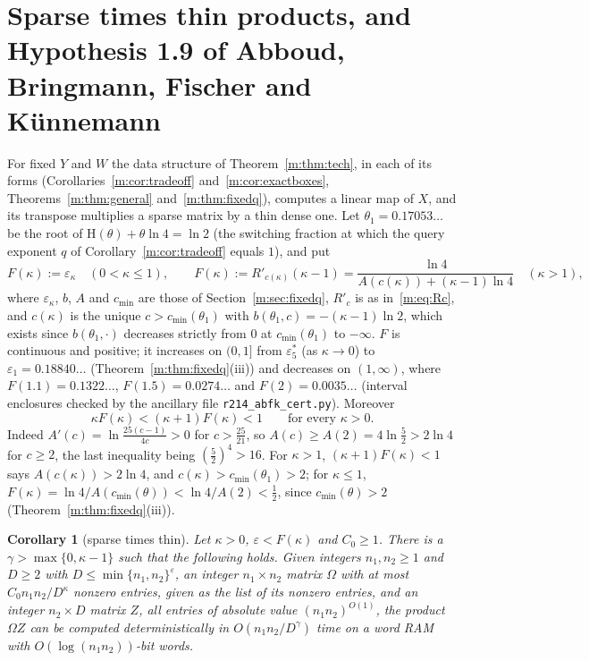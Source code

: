\documentclass[11pt]{article}
\newtheorem{corollary}[theorem]{Corollary}
\theoremstyle{definition}
\theoremstyle{remark}
\newcommand{\Hh}{\mathrm{H}}
\newcommand{\es}{\varepsilon^*_5}
\newcommand{\HintedOMvRfourteen}{0.18840}%
\newcommand{\ThetaOne}{0.17053}%
\newcommand{\ABFKFDSoneone}{0.1322}%
\newcommand{\ABFKFDSonefive}{0.0274}%
\newcommand{\ABFKFDStwo}{0.0035}%
\begin{document}
\section{Sparse times thin products, and Hypothesis 1.9 of Abboud, Bringmann, Fischer and K\"unnemann}\label{m:sec:abfk}

For fixed $Y$ and $W$ the data structure of Theorem~\ref{m:thm:tech}, in each of its forms (Corollaries~\ref{m:cor:tradeoff} and~\ref{m:cor:exactboxes}, Theorems~\ref{m:thm:general} and~\ref{m:thm:fixedq}), computes a linear map of $X$, and its transpose multiplies a sparse matrix by a thin dense one. Let $\theta_1=\ThetaOne\ldots$ be the root of $\Hh(\theta)+\theta\ln4=\ln2$ (the switching fraction at which the query exponent $q$ of Corollary~\ref{m:cor:tradeoff} equals $1$), and put
\[
F(\kappa):=\varepsilon_\kappa\quad(0<\kappa\le1),\qquad
F(\kappa):=R'_{c(\kappa)}(\kappa-1)=\frac{\ln4}{A(c(\kappa))+(\kappa-1)\ln4}\quad(\kappa>1),
\]
where $\varepsilon_\kappa$, $b$, $A$ and $c_{\min}$ are those of Section~\ref{m:sec:fixedq}, $R'_c$ is as in~\eqref{m:eq:Rc}, and $c(\kappa)$ is the unique $c>c_{\min}(\theta_1)$ with $b(\theta_1,c)=-(\kappa-1)\ln2$, which exists since $b(\theta_1,\cdot)$ decreases strictly from $0$ at $c_{\min}(\theta_1)$ to $-\infty$. $F$ is continuous and positive; it increases on $(0,1]$ from $\es$ (as $\kappa\to0$) to $\varepsilon_1=\HintedOMvRfourteen\ldots$ (Theorem~\ref{m:thm:fixedq}(iii)) and decreases on $(1,\infty)$, where $F(1.1)=\ABFKFDSoneone\ldots$, $F(1.5)=\ABFKFDSonefive\ldots$ and $F(2)=\ABFKFDStwo\ldots$ (interval enclosures checked by the ancillary file \texttt{r214\_abfk\_cert.py}). Moreover
\[
\kappa F(\kappa)<(\kappa+1)F(\kappa)<1\qquad\text{for every }\kappa>0.
\]
Indeed $A'(c)=\ln\frac{25(c-1)}{4c}>0$ for $c>\frac{25}{21}$, so $A(c)\ge A(2)=4\ln\frac52>2\ln4$ for $c\ge2$, the last inequality being $(\frac52)^4>16$. For $\kappa>1$, $(\kappa+1)F(\kappa)<1$ says $A(c(\kappa))>2\ln4$, and $c(\kappa)>c_{\min}(\theta_1)>2$; for $\kappa\le1$, $F(\kappa)=\ln4/A(c_{\min}(\theta))<\ln4/A(2)<\frac12$, since $c_{\min}(\theta)>2$ (Theorem~\ref{m:thm:fixedq}(iii)).

\begin{corollary}[sparse times thin]\label{m:cor:sparsethin}
Let $\kappa>0$, $\varepsilon<F(\kappa)$ and $C_0\ge1$. There is a $\gamma>\max\{0,\kappa-1\}$ such that the following holds. Given integers $n_1,n_2\ge1$ and $D\ge2$ with $D\le\min\{n_1,n_2\}^\varepsilon$, an integer $n_1\times n_2$ matrix $\Omega$ with at most $C_0n_1n_2/D^\kappa$ nonzero entries, given as the list of its nonzero entries, and an integer $n_2\times D$ matrix $Z$, all entries of absolute value $(n_1n_2)^{O(1)}$, the product $\Omega Z$ can be computed deterministically in $O(n_1n_2/D^\gamma)$ time on a word RAM with $O(\log(n_1n_2))$-bit words.
\end{corollary}
\end{document}
